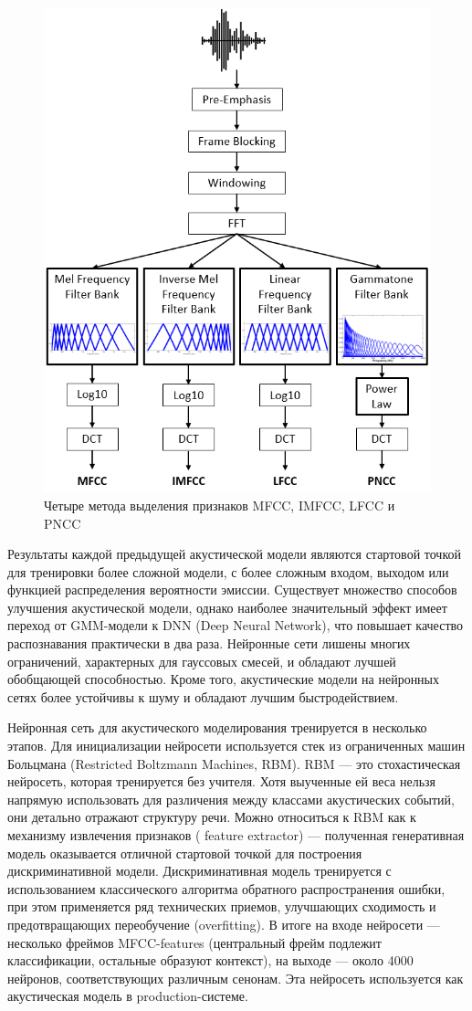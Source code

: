 \begin{figure}[h]
\includegraphics[width=0.75\columnwidth]{./img/mel.png}
\centering
\caption{Четыре метода выделения признаков MFCC, IMFCC, LFCC и PNCC}
\label{pic:mel}
\end{figure}
  

Результаты каждой предыдущей акустической модели являются 
стартовой точкой для тренировки более сложной модели, с более сложным входом, выходом или функцией распределения вероятности эмиссии. 
Существует множество способов улучшения акустической модели, однако наиболее значительный эффект имеет переход от GMM-модели к DNN (Deep Neural Network), 
что повышает качество распознавания практически в два раза. Нейронные сети лишены многих ограничений, характерных для гауссовых смесей, и обладают лучшей обобщающей способностью. 
Кроме того, акустические модели на нейронных сетях более устойчивы к шуму и обладают лучшим быстродействием.


Нейронная сеть для акустического моделирования тренируется в несколько этапов. Для инициализации нейросети используется стек из ограниченных машин Больцмана 
(Restricted Boltzmann Machines, RBM). RBM — это стохастическая нейросеть, которая тренируется без учителя. Хотя выученные ей веса нельзя напрямую использовать 
для различения между классами акустических событий, они детально отражают структуру речи. Можно относиться к RBM как к механизму извлечения признаков (
feature extractor) — полученная генеративная модель оказывается отличной стартовой точкой для построения дискриминативной модели. 
Дискриминативная модель тренируется с использованием классического алгоритма обратного распространения ошибки, при этом применяется ряд технических приемов, 
улучшающих сходимость и предотвращающих переобучение (overfitting). В итоге на входе нейросети — несколько фреймов MFCC-features 
(центральный фрейм подлежит классификации, остальные образуют контекст), на выходе — около 4000 нейронов, соответствующих различным сенонам. 
Эта нейросеть используется как акустическая модель в production-системе.

